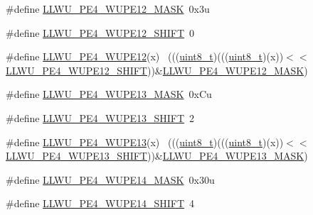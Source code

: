 \begin{DoxyCompactItemize}
\item 
\#define \hyperlink{group___l_l_w_u___register___masks_ga0d1b6351b58cc9fbf3099dc653754205}{L\+L\+W\+U\+\_\+\+P\+E4\+\_\+\+W\+U\+P\+E12\+\_\+\+M\+A\+SK}~0x3u
\item 
\#define \hyperlink{group___l_l_w_u___register___masks_gaddb0a17347a85705dc2c2975129a7942}{L\+L\+W\+U\+\_\+\+P\+E4\+\_\+\+W\+U\+P\+E12\+\_\+\+S\+H\+I\+FT}~0
\item 
\#define \hyperlink{group___l_l_w_u___register___masks_ga8e7cffacb80520d478d473836699ca90}{L\+L\+W\+U\+\_\+\+P\+E4\+\_\+\+W\+U\+P\+E12}(x)                                          ~(((\hyperlink{_p_e___types_8h_aba7bc1797add20fe3efdf37ced1182c5}{uint8\+\_\+t})(((\hyperlink{_p_e___types_8h_aba7bc1797add20fe3efdf37ced1182c5}{uint8\+\_\+t})(x))$<$$<$\hyperlink{group___l_l_w_u___register___masks_gaddb0a17347a85705dc2c2975129a7942}{L\+L\+W\+U\+\_\+\+P\+E4\+\_\+\+W\+U\+P\+E12\+\_\+\+S\+H\+I\+FT}))\&\hyperlink{group___l_l_w_u___register___masks_ga0d1b6351b58cc9fbf3099dc653754205}{L\+L\+W\+U\+\_\+\+P\+E4\+\_\+\+W\+U\+P\+E12\+\_\+\+M\+A\+SK})
\item 
\#define \hyperlink{group___l_l_w_u___register___masks_ga4d9218c37bd27ed586a5e73aa1b20a84}{L\+L\+W\+U\+\_\+\+P\+E4\+\_\+\+W\+U\+P\+E13\+\_\+\+M\+A\+SK}~0x\+Cu
\item 
\#define \hyperlink{group___l_l_w_u___register___masks_ga176680468b0cf75fbccc4a8be5d45388}{L\+L\+W\+U\+\_\+\+P\+E4\+\_\+\+W\+U\+P\+E13\+\_\+\+S\+H\+I\+FT}~2
\item 
\#define \hyperlink{group___l_l_w_u___register___masks_gafa974009218f2ecef874d09fa44d6f39}{L\+L\+W\+U\+\_\+\+P\+E4\+\_\+\+W\+U\+P\+E13}(x)                                          ~(((\hyperlink{_p_e___types_8h_aba7bc1797add20fe3efdf37ced1182c5}{uint8\+\_\+t})(((\hyperlink{_p_e___types_8h_aba7bc1797add20fe3efdf37ced1182c5}{uint8\+\_\+t})(x))$<$$<$\hyperlink{group___l_l_w_u___register___masks_ga176680468b0cf75fbccc4a8be5d45388}{L\+L\+W\+U\+\_\+\+P\+E4\+\_\+\+W\+U\+P\+E13\+\_\+\+S\+H\+I\+FT}))\&\hyperlink{group___l_l_w_u___register___masks_ga4d9218c37bd27ed586a5e73aa1b20a84}{L\+L\+W\+U\+\_\+\+P\+E4\+\_\+\+W\+U\+P\+E13\+\_\+\+M\+A\+SK})
\item 
\#define \hyperlink{group___l_l_w_u___register___masks_gae3a1e7b7497f719cfebd559f31dc4d07}{L\+L\+W\+U\+\_\+\+P\+E4\+\_\+\+W\+U\+P\+E14\+\_\+\+M\+A\+SK}~0x30u
\item 
\#define \hyperlink{group___l_l_w_u___register___masks_ga1942d07f99eb5afb836650dcfb2185af}{L\+L\+W\+U\+\_\+\+P\+E4\+\_\+\+W\+U\+P\+E14\+\_\+\+S\+H\+I\+FT}~4

\end{DoxyCompactItemize}
